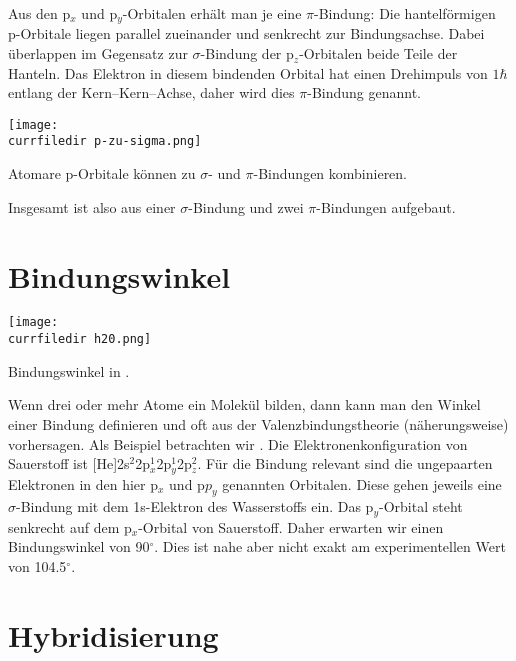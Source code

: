 Aus den p$_x$ und p$_y$-Orbitalen erhält man je eine $\pi$-Bindung: Die hantelförmigen p-Orbitale liegen parallel zueinander und senkrecht zur Bindungsachse. Dabei überlappen im Gegensatz zur $\sigma$-Bindung der p$_z$-Orbitalen beide Teile der Hanteln. Das Elektron in diesem bindenden Orbital hat einen Drehimpuls von $1 \hbar$ entlang der Kern--Kern--Achse, daher wird dies $\pi$-Bindung genannt.

%
\begin{marginfigure}
\texttt{[image: \\currfiledir p-zu-sigma.png]}
\caption{Atomare p-Orbitale können zu $\sigma$- und $\pi$-Bindungen kombinieren. }
\end{marginfigure}
%

Insgesamt ist  also aus einer $\sigma$-Bindung und zwei $\pi$-Bindungen aufgebaut.


\section{Bindungswinkel}

%
\begin{marginfigure}
\texttt{[image: \\currfiledir h20.png]}
\caption{Bindungswinkel in  . }
\end{marginfigure}
%
Wenn drei oder mehr Atome ein Molekül bilden, dann kann man den Winkel einer Bindung definieren und oft aus der Valenzbindungstheorie (näherungsweise) vorhersagen. Als Beispiel betrachten wir . Die Elektronenkonfiguration von Sauerstoff ist [He]2s$^2$2p$_x^1$2p$_y^1$2p$_z^2$. Für die Bindung relevant sind die ungepaarten Elektronen in den hier p$_x$ und p$p_y$ genannten Orbitalen. Diese gehen jeweils eine $\sigma$-Bindung mit dem 1s-Elektron des Wasserstoffs ein. Das p$_y$-Orbital steht senkrecht auf dem  p$_x$-Orbital von Sauerstoff. Daher erwarten wir einen Bindungswinkel von 90$^\circ$. Dies ist nahe aber nicht exakt am experimentellen Wert von 104.5$^\circ$.



\section{Hybridisierung}

